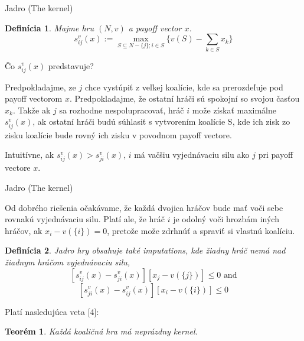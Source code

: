 \documentclass{beamer}
\newtheorem*{thm}{Teor\'em}
\newtheorem*{mydef}{Defin\'icia}
\begin{document}
\begin{frame}{Jadro (The kernel)}

\begin{mydef}
Majme hru $(N,v)$ a payoff vector $x$.
\[s_{ij}^{v}(x):=\max_{S \subseteq N-\{j\}; i \in S}\{v(S) - \sum_{k \in S}x_{k}\}\]
\end{mydef}

\v{C}o $s_{ij}^{v}(x)$ predstavuje? 

Predpokladajme, ze $j$ chce vyst\'upi\v{t} z ve\v{l}kej koal\'icie, kde sa prerozde\v{l}uje pod payoff vectorom $x$. Predpokladajme, \v{z}e ostatn\'i hr\'a\v{c}i s\'u spokojn\'i so svojou \v{c}as\v{t}ou $x_{k}$. Tak\v{z}e ak $j$ sa rozhodne nespolupracova\v{t}, hr\'a\v{c} $i$ mo\v{z}e z\'iska\v{t} maxim\'alne $s_{ij}^{v}(x)$, ak ostatn\'i hr\'a\v{c}i bud\'u s\'uhlasi\v{t} s vytvoren\'im koal\'icie S, kde ich zisk zo zisku koal\'icie bude rovn\'y ich zisku v povodnom payoff vectore. 

Intuit\'ivne, ak $s_{ij}^{v}(x) > s_{ji}^{v}(x)$, $i$ m\'a va\v{c}\v{s}iu vyjedn\'avaciu silu ako $j$ pri payoff vectore $x$.

\end{frame}



\begin{frame}{Jadro (The kernel)}

Od dobr\'eho rie\v{s}enia o\v{c}ak\'avame, \v{z}e ka\v{z}d\'a dvojica hr\'a\v{c}ov bude ma\v{t} vo\v{c}i sebe rovnak\'u vyjedn\'avaciu silu. Plat\'i ale, \v{z}e hr\'a\v{c} $i$ je odoln\'y vo\v{c}i hrozb\'am in\'ych hr\'a\v{c}ov, ak $x_{i}-v(\{i\})=0$, preto\v{z}e mo\v{z}e zdrhn\'u\v{t} a spravi\'t si vlastn\'u koal\'iciu.

\begin{mydef}
Jadro hry obsahuje tak\'e imputations, kde \v{z}iadny hr\'a\v{c} nem\'a nad \v{z}iadnym hr\'a\v{c}om vyjedn\'avaciu silu, 
\[ [s_{ij}^{v}(x) - s_{ji}^{v}(x)][x_{j}-v(\{j\})] \leq 0 \textrm{ and}\]
\[ [s_{ji}^{v}(x) - s_{ij}^{v}(x)][x_{i}-v(\{i\})] \leq 0 \]

\end{mydef}

Plat\'i nasleduj\'uca veta [4]:

\begin{thm}
Ka\v{z}d\'a koali\v{c}n\'a hra m\'a nepr\'azdny kernel. 
\end{thm}

\end{frame}
\end{document}
